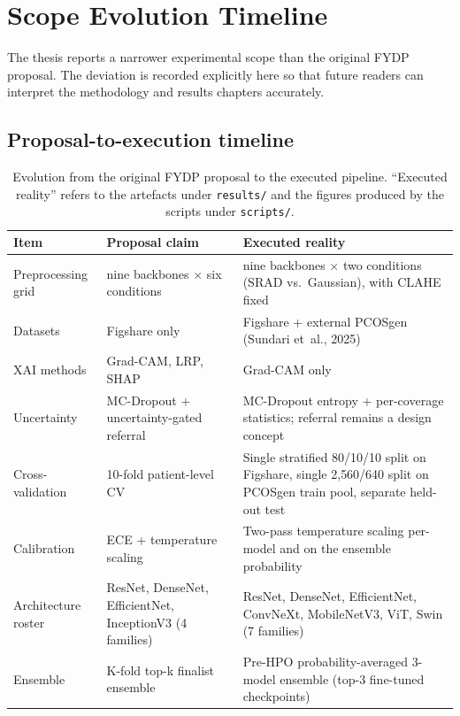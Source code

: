 \documentclass[../preamble.tex]{subfiles}
\begin{document}
\chapter{Scope Evolution Timeline}
\label{app:scope-evolution}

The thesis reports a narrower experimental scope than the original FYDP
proposal. The deviation is recorded explicitly here so that future readers
can interpret the methodology and results chapters accurately.

\section{Proposal-to-execution timeline}
\label{app:scope-timeline}

\begin{table}[htbp]
  \centering
  \small
  \caption{Evolution from the original FYDP proposal to the executed pipeline.
           ``Executed reality'' refers to the artefacts under
           \texttt{results/} and the figures produced by the scripts under
           \texttt{scripts/}.}
  \label{tab:scope-evolution}
  \begin{tabularx}{\linewidth}{@{}lXX@{}}
    \toprule
    \textbf{Item} & \textbf{Proposal claim} & \textbf{Executed reality} \\
    \midrule
    Preprocessing grid & nine backbones $\times$ six conditions
                       & nine backbones $\times$ two conditions (SRAD vs.\ Gaussian), with CLAHE fixed \\
    Datasets          & Figshare only
                       & Figshare + external PCOSgen (Sundari et~al., 2025) \\
    XAI methods       & Grad-CAM, LRP, SHAP
                       & Grad-CAM only \\
    Uncertainty       & MC-Dropout + uncertainty-gated referral
                       & MC-Dropout entropy + per-coverage statistics; referral remains a design concept \\
    Cross-validation  & 10-fold patient-level CV
                       & Single stratified 80/10/10 split on Figshare, single 2{,}560/640 split on PCOSgen train pool, separate held-out test \\
    Calibration       & ECE + temperature scaling
                       & Two-pass temperature scaling per-model and on the ensemble probability \\
    Architecture roster & ResNet, DenseNet, EfficientNet, InceptionV3 (4 families)
                       & ResNet, DenseNet, EfficientNet, ConvNeXt, MobileNetV3, ViT, Swin (7 families) \\
    Ensemble          & K-fold top-k finalist ensemble
                       & Pre-HPO probability-averaged 3-model ensemble (top-3 fine-tuned checkpoints) \\
    \bottomrule
  \end{tabularx}
\end{table}
\end{document}

